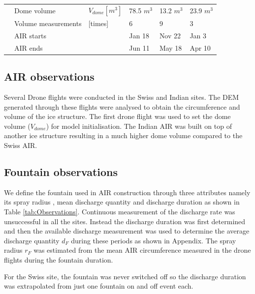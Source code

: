 \documentclass[utf8]{frontiersSCNS} %
\begin{document}
\begin{table}
\begin{tabular}{@{}|llllll|@{}}
		\multicolumn{1}{|l|}{\multirow{4}{*}{\rotatebox[origin=c]{90}{AIR}}}
		                       & Dome volume                 & $V_{dome}[m^{3}]$         & 78.5 $m^{3}$  & 13.2 $m^{3}$  & 23.9 $m^{3}$  \\
		\multicolumn{1}{|l|}{} & Volume measurements         & [times]                   & 6             & 9             & 3             \\
		\multicolumn{1}{|l|}{} & AIR starts                  &                           & Jan 18        & Nov 22        & Jan 3         \\
		\multicolumn{1}{|l|}{} & AIR ends                    &                           & Jun 11        & May 18        & Apr 10        \\ \bottomrule
	\end{tabular}
\end{table}


\subsection{AIR observations}
Several Drone flights were conducted in the Swiss and Indian sites. The DEM generated through these flights were
analysed to obtain the circumference and volume of the ice structure. The first drone flight was used to set the dome
volume ($V_{dome}$) for model initialisation. The Indian AIR was built on top of another ice structure resulting in a
much higher dome volume compared to the Swiss AIR.

\subsection{Fountain observations}
We define the fountain used in AIR construction through three attributes namely its spray radius , mean discharge
quantity and discharge duration as shown in Table \ref{tab:Observations}. Continuous measurement of the discharge rate
was unsuccessful in all the sites. Instead the discharge duration was first determined and then the available discharge
measurement was used to determine the average discharge quantity $d_F$ during these periods as shown in Appendix. The
spray radius $r_F$ was estimated from the mean AIR circumference measured in the drone flights during the fountain
duration.

For the Swiss site, the fountain was never switched off so the discharge duration was extrapolated from just one fountain
on and off event each.
\end{document}
